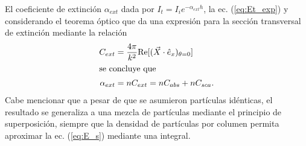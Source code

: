 El coeficiente de extinción $\alpha_{ext}$ dada por $I_t = I_i e^{-\alpha_{ext} h}$, la ec. (\ref{eq:Et_exp}) y considerando el teorema óptico que da una expresión para la sección transversal de extinción mediante la relación
\begin{align}
C_{ext} & = \frac{4\pi}{k^2}\text{Re}[(\vec{X}\cdot\hat{e}_x)_{\theta=0}] \\
\intertext{se concluye que }
\alpha_{ext} &= n C_{ext} = nC_{abs}+nC_{sca}.
\end{align}
Cabe mencionar que a pesar de que se asumieron partículas idénticas, el resultado se generaliza a una mezcla de partículas mediante el principio de superposición, siempre que la densidad de partículas por columen permita aproximar la ec. (\ref{eq:E_s}) mediante una integral.
